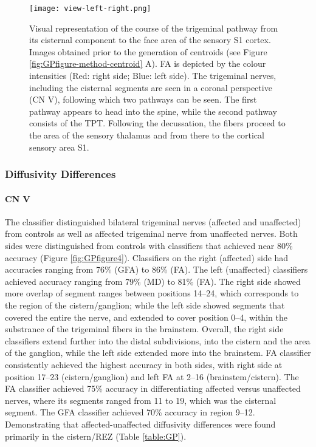 \begin{figure}[ht]
\centering
\texttt{[image: view-left-right.png]}
\caption{Visual representation of the course of the trigeminal pathway from its cisternal component to the face area of the sensory S1 cortex. Images obtained prior to the generation of centroids (see Figure \ref{fig:GPfigure-method-centroid} A). FA is depicted by the colour intensities (Red: right side; Blue: left side). The trigeminal nerves, including the cisternal segments are seen in a coronal perspective (CN V), following which two pathways can be seen. The first pathway appears to head into the spine, while the second pathway consists of the TPT. Following the decussation, the fibers proceed to the area of the sensory thalamus and from there to the cortical sensory area S1.}
\label{fig:GPfigure3}
\end{figure}

\subsubsection{Diffusivity Differences}
\paragraph{CN V}
The classifier distinguished bilateral trigeminal nerves (affected and unaffected) from controls as well as affected trigeminal nerve from unaffected nerves. Both sides were distinguished from controls with classifiers that achieved near 80\% accuracy (Figure \ref{fig:GPfigure4}). 
Classifiers on the right (affected) side had accuracies ranging from 76\% (GFA) to 86\% (FA). The left (unaffected) classifiers achieved accuracy ranging from 79\% (MD) to 81\% (FA). The right side showed more overlap of segment ranges between positions 14--24, which corresponds to the region of the cistern/ganglion; while the left side showed segments that covered the entire the nerve, and extended to cover position 0--4, within the substrance of the trigeminal fibers in the brainstem. Overall, the right side classifiers extend further into the distal subdivisions, into the cistern and the area of the ganglion, while the left side extended more into the brainstem. FA classifier consistently achieved the highest accuracy in both sides, with right side at position 17--23 (cistern/ganglion) and left FA at 2--16 (brainstem/cistern).
The FA classifier achieved 75\% accuracy in differentiating affected versus unaffected nerves, where its segments ranged from 11 to 19, which was the cisternal segment. The GFA classifier achieved 70\% accuracy in region 9--12. Demonstrating that affected-unaffected diffusivity differences were found primarily in the cistern/REZ (Table \ref{table:GP}).

